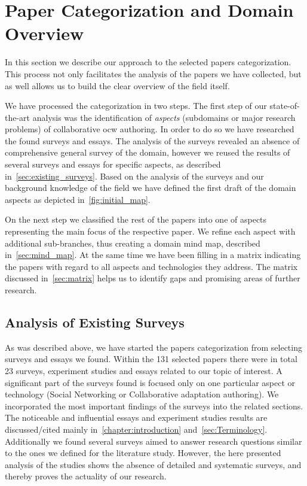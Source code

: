 \documentclass[PhD, Submit, ngerman,UKenglish,table]{scrbook}
\begin{document}
\begin{itemize}
\end{itemize}

\section{Paper Categorization and Domain Overview}
In this section we describe our approach to the selected papers categorization.
This process not only facilitates the analysis of the papers we have collected, but as well allows us to build the clear overview of the field itself.

We have processed the categorization in two steps.
The first step of our state-of-the-art analysis was the identification of \emph{aspects} (subdomains or major research problems) of collaborative \gls{ocw} authoring.
In order to do so we have researched the found surveys and essays.
The analysis of the surveys revealed an absence of comprehensive general survey of the domain, however we reused the results of several surveys and essays for specific aspects, as described in~\autoref{sec:existing_surveys}.
Based on the analysis of the surveys and our background knowledge of the field we have defined the first draft of the domain aspects as depicted in~\autoref{fig:initial_map}.

On the next step we classified the rest of the papers into one of aspects representing the main focus of the respective paper.
We refine each aspect with additional sub-branches, thus creating a domain mind map, described in~\autoref{sec:mind_map}.
At the same time we have been filling in a matrix indicating the papers with regard to all aspects and technologies they address.
The matrix discussed in~\autoref{sec:matrix} helps us to identify gaps and promising areas of further research.

\subsection{Analysis of Existing Surveys}
\label{sec:existing_surveys}

As was described above, we have started the papers categorization from selecting surveys and essays we found.
Within the 131 selected papers there were in total 23 surveys, experiment studies and essays related to our topic of interest. 
A significant part of the surveys found is focused only on one particular aspect or technology (Social Networking or Collaborative adaptation authoring).
We incorporated the most important findings of the surveys into the related sections.
The noticeable and influential essays and experiment studies results are discussed/cited mainly in~\autoref{chapter:introduction} and~\autoref{sec:Terminology}.
Additionally we found several surveys aimed to answer research questions similar to the ones we defined for the literature study.
However, the here presented analysis of the studies shows the absence of detailed and systematic surveys, and thereby proves the actuality of our research.  
\end{document}
